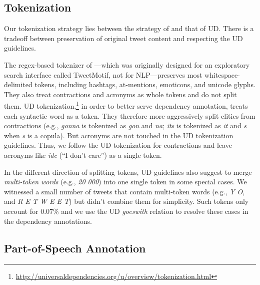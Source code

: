 \documentclass[11pt,a4paper]{article}
\begin{document}
\subsection{Tokenization}\label{sec:tok-anno}
Our tokenization strategy lies between the strategy of
\citet{ICWSM101540} and that of UD.
There is a tradeoff between preservation of original tweet content and respecting
the UD guidelines.

The regex-based tokenizer of \citet{ICWSM101540}---which was 
originally designed for an exploratory search interface called
TweetMotif, not for NLP---preserves most whitespace-delimited tokens, including 
hashtags, at-mentions, emoticons, and unicode glyphs. 
They also treat contractions and acronyms as whole tokens and do not split them.
UD
tokenization,\footnote{\url{http://universaldependencies.org/u/overview/tokenization.html}}
in order to better serve dependency annotation, treats each syntactic word as a token.
They therefore more aggressively split
clitics from contractions (e.g., {\it  gonna} is tokenized as {\it gon} and {\it na}; {\it its}
is tokenized as {\it it} and {\it s} when {\it s} is a copula).
But acronyms are not touched
in the UD tokenization guidelines. Thus, we follow the UD tokenization for contractions
and leave acronyms like {\em idc} (``I don't care'') as a single token. 

In the different direction of splitting tokens, UD guidelines also suggest to merge
{\it multi-token words} (e.g., {\it 20 000}) into one single token in some special
cases. We witnessed a small number of tweets that contain multi-token words
(e.g., {\it Y O}, and {\it R E T W E E T}) but didn't combine them for simplicity.
Such tokens only account for 0.07\% and we use the UD
  {\it goeswith} relation to resolve these cases in the dependency annotations.

\subsection{Part-of-Speech Annotation}\label{sec:pos-anno}
\end{document}
